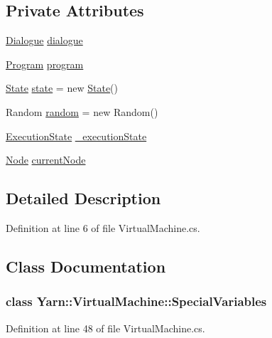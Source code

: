 \subsection*{Private Attributes}
\begin{DoxyCompactItemize}
\item 
\hyperlink{a00086}{Dialogue} \hyperlink{a00156_ac506426c503da5f033247c29e11c5e82}{dialogue}
\item 
\hyperlink{a00146}{Program} \hyperlink{a00156_a2695dbfe3d9df7ffa3f13ad2231217fb}{program}
\item 
\hyperlink{a00159}{State} \hyperlink{a00156_a70f2ce6201cdd2430ceaa764ac614ca0}{state} = new \hyperlink{a00159}{State}()
\item 
Random \hyperlink{a00156_a408485a00c7cc558428c86ed9dd04fca}{random} = new Random()
\item 
\hyperlink{a00156_add28fa9c8a45ca579e84d05920bbc42d}{Execution\-State} \hyperlink{a00156_a0ae362616d85f028b7ec3230388926f4}{\-\_\-execution\-State}
\item 
\hyperlink{a00045_a00367}{Node} \hyperlink{a00156_ab7594e14981ad75cecea3b2e7dcf895c}{current\-Node}
\end{DoxyCompactItemize}


\subsection{Detailed Description}


Definition at line 6 of file Virtual\-Machine.\-cs.



\subsection{Class Documentation}
\label{a00369}
\hypertarget{a00156_a00369}{}
\subsubsection{class Yarn\-:\-:Virtual\-Machine\-:\-:Special\-Variables}


Definition at line 48 of file Virtual\-Machine.\-cs.



